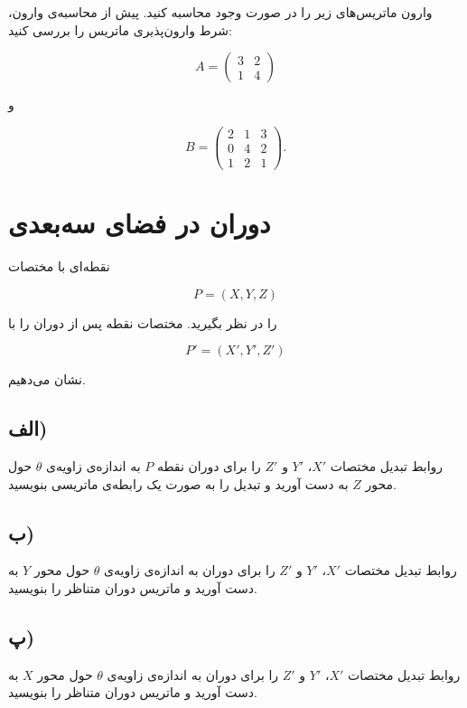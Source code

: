 \documentclass[a4paper,16pt]{article}
\begin{document}
	وارون ماتریس‌های زیر را در صورت وجود محاسبه کنید. پیش از محاسبه‌ی وارون، شرط وارون‌پذیری ماتریس را بررسی کنید:
	
	\[
	A=
	\begin{pmatrix}
		3&2\\
		1&4
	\end{pmatrix}
	\]
	
	و
	
	\[
	B=
	\begin{pmatrix}
		2&1&3\\
		0&4&2\\
		1&2&1
	\end{pmatrix}.
	\]
	
	
	
	\section{دوران در فضای سه‌بعدی}
	
	نقطه‌ای با مختصات
	
	\[
	P=(X,Y,Z)
	\]
	
	را در نظر بگیرید. مختصات نقطه پس از دوران را با
	
	\[
	P'=(X',Y',Z')
	\]
	
	نشان می‌دهیم.
	
	\subsection*{الف)}
	
	روابط تبدیل مختصات $X'$، $Y'$ و $Z'$ را برای دوران نقطه $P$ به اندازه‌ی زاویه‌ی $\theta$ حول محور $Z$ به دست آورید و تبدیل را به صورت یک رابطه‌ی ماتریسی بنویسید.
	
	\subsection*{ب)}
	
	روابط تبدیل مختصات $X'$، $Y'$ و $Z'$ را برای دوران به اندازه‌ی زاویه‌ی $\theta$ حول محور $Y$ به دست آورید و ماتریس دوران متناظر را بنویسید.
	
	\subsection*{پ)}
	
	روابط تبدیل مختصات $X'$، $Y'$ و $Z'$ را برای دوران به اندازه‌ی زاویه‌ی $\theta$ حول محور $X$ به دست آورید و ماتریس دوران متناظر را بنویسید.
	
\end{document}
